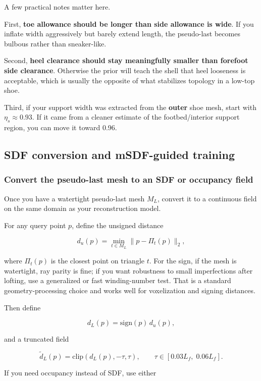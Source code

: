 \documentclass[
  10.5pt,
]{article}
\begin{document}
A few practical notes matter here.

First, \textbf{toe allowance should be longer than side allowance is
wide}. If you inflate width aggressively but barely extend length, the
pseudo-last becomes bulbous rather than sneaker-like.

Second, \textbf{heel clearance should stay meaningfully smaller than
forefoot side clearance}. Otherwise the prior will teach the shell that
heel looseness is acceptable, which is usually the opposite of what
stabilizes topology in a low-top shoe.

Third, if your support width was extracted from the \textbf{outer} shoe
mesh, start with \(\eta_s \approx 0.93\). If it came from a cleaner
estimate of the footbed/interior support region, you can move it toward
0.96.

\subsection{SDF conversion and mSDF-guided
training}\label{sdf-conversion-and-msdf-guided-training}

\subsubsection{Convert the pseudo-last mesh to an SDF or occupancy
field}\label{convert-the-pseudo-last-mesh-to-an-sdf-or-occupancy-field}

Once you have a watertight pseudo-last mesh \(M_L\), convert it to a
continuous field on the same domain as your reconstruction model.

For any query point \(p\), define the unsigned distance

\[
d_u(p) = \min_{t\in M_L} \|p-\Pi_t(p)\|_2,
\]

where \(\Pi_t(p)\) is the closest point on triangle \(t\). For the sign,
if the mesh is watertight, ray parity is fine; if you want robustness to
small imperfections after lofting, use a generalized or fast
winding-number test. That is a standard geometry-processing choice and
works well for voxelization and signing distances.

Then define

\[
d_L(p)=\text{sign}(p)\,d_u(p),
\]

and a truncated field

\[
\tilde d_L(p)=\mathrm{clip}(d_L(p),-\tau,\tau),
\qquad \tau \in [0.03L_f,\;0.06L_f].
\]

If you need occupancy instead of SDF, use either
\end{document}
